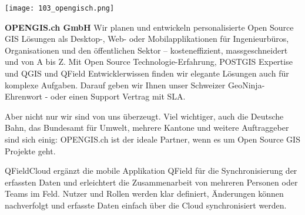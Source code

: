 \begin{flushright}
\texttt{[image: 103\_opengisch.png]}
\end{flushright}
\noindent
{\bfseries OPENGIS.ch GmbH} Wir planen und entwickeln personalisierte Open Source GIS Lösungen als Desktop-, Web- oder Mobilapplikationen für Ingenieurbüros, Organisationen und den öffentlichen Sektor – kosteneffizient, massgeschneidert und von A bis Z. Mit Open Source Technologie-Erfahrung, POSTGIS Expertise und QGIS und QField Entwicklerwissen finden wir elegante Lösungen auch für komplexe Aufgaben. Darauf geben wir Ihnen unser Schweizer GeoNinja-Ehrenwort - oder einen Support Vertrag mit SLA.

\noindent
Aber nicht nur wir sind von uns überzeugt. Viel wichtiger, auch die Deutsche Bahn, das Bundesamt für Umwelt, mehrere Kantone und weitere Auftraggeber sind sich einig: OPENGIS.ch ist der ideale Partner, wenn es um Open Source GIS Projekte geht.

\noindent
QFieldCloud ergänzt die mobile Applikation QField für die Synchronisierung der erfassten Daten und erleichtert die Zusammenarbeit von mehreren Personen oder Teams im Feld. Nutzer und Rollen werden klar definiert, Änderungen können nachverfolgt und erfasste Daten einfach über die Cloud synchronisiert werden.

